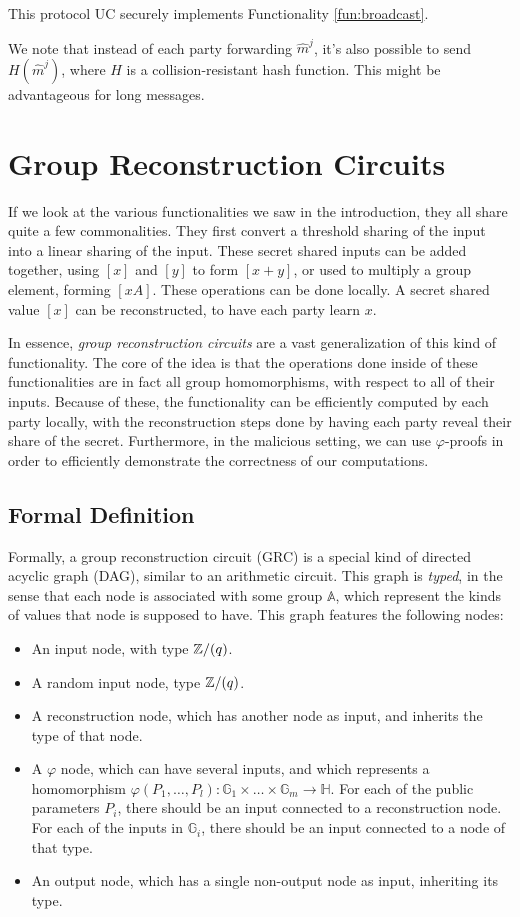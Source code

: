 This protocol UC securely implements Functionality \ref{fun:broadcast}.

We note that instead of each party forwarding $\hat{m}^j$, it's also possible
to send $H(\hat{m}^j)$, where $H$ is a collision-resistant hash function.
This might be advantageous for long messages.

\section{Group Reconstruction Circuits}

If we look at the various functionalities we saw in the introduction,
they all share quite a few commonalities. They first convert
a threshold sharing of the input into a linear sharing of the input.
These secret shared inputs can be added together, using $[x]$ and $[y]$
to form $[x + y]$, or used to multiply a group element, forming
$[xA]$. These operations can be done locally.
A secret shared value $[x]$ can be reconstructed, to have each party learn $x$.

In essence, \emph{group reconstruction circuits} are a vast generalization
of this kind of functionality. The core of the idea is that the operations
done inside of these functionalities are in fact all group homomorphisms,
with respect to all of their inputs. Because of these, the functionality
can be efficiently computed by each party locally, with the reconstruction
steps done by having each party reveal their share of the secret.
Furthermore, in the malicious setting, we can use $\varphi$-proofs in
order to efficiently demonstrate the correctness of our computations.

\subsection{Formal Definition}

Formally, a group reconstruction circuit (GRC) is a special kind of
directed acyclic graph (DAG), similar to an arithmetic circuit.
This graph is \emph{typed}, in the sense that each node is associated
with some group $\mathbb{A}$, which represent the kinds of values
that node is supposed to have.
This graph features the following nodes:

\begin{itemize}
    \item An input node, with type $\mathbb{Z}/(q)$.
    \item A random input node, type $\mathbb{Z}/(q)$.
    \item A reconstruction node, which has another node as input, and inherits the type of that node.
    \item A $\varphi$ node, which can have several inputs, and which represents
    a homomorphism
    $\varphi(P_1, \ldots, P_l) : \mathbb{G}_1 \times \ldots \times \mathbb{G}_m \to \mathbb{H}$.
    For each of the public parameters $P_i$, there should be an input connected to a reconstruction node.
    For each of the inputs in $\mathbb{G}_i$, there should be an input connected to a node of that type.
    \item An output node, which has a single non-output node as input, inheriting its type.
\end{itemize}

